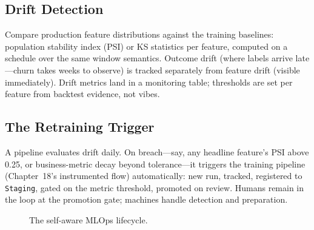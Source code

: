 \subsection{Drift Detection}
Compare production feature distributions against the training baselines: population stability index (PSI) or KS statistics per feature, computed on a schedule over the same window semantics. Outcome drift (where labels arrive late---churn takes weeks to observe) is tracked separately from feature drift (visible immediately). Drift metrics land in a monitoring table; thresholds are set per feature from backtest evidence, not vibes.

\subsection{The Retraining Trigger}
A pipeline evaluates drift daily. On breach---say, any headline feature's PSI above 0.25, or business-metric decay beyond tolerance---it triggers the training pipeline (Chapter~18's instrumented flow) automatically: new run, tracked, registered to \texttt{Staging}, gated on the metric threshold, promoted on review. Humans remain in the loop at the promotion gate; machines handle detection and preparation.

\begin{figure}[H]
    \centering
    \caption{The self-aware MLOps lifecycle.}
    \label{fig:chapter20-mlops}
\end{figure}


